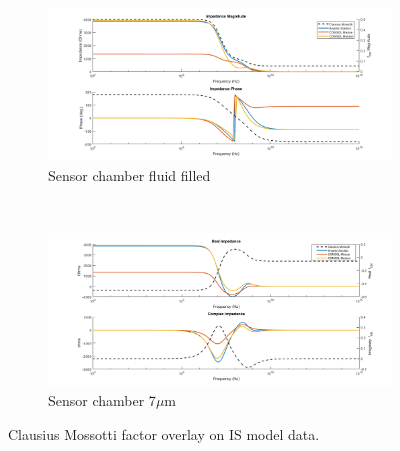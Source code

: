\begin{figure}[h]
    \centering
    \begin{subfigure}[b]{\textwidth}
        \centering
        \includegraphics[width=\textwidth]{images/IS_model_difference_mag_phase_CM_overlay.png}
        \caption{Sensor chamber fluid filled}
    \end{subfigure}
    \\
    \vspace{0.1 in}
    \begin{subfigure}[b]{\textwidth}
        \centering
        \includegraphics[width=\textwidth]{images/IS_model_real_imag_difference_CM_overlay.png}
        \caption{Sensor chamber 7$\mu$m }
    \end{subfigure}

    \caption[Clausius Mossotti factor overlay on IS model data.]{Clausius Mossotti factor overlay on IS model data.}
    \label{fig:IS_model_difference_fcm_overlay}
\end{figure}

